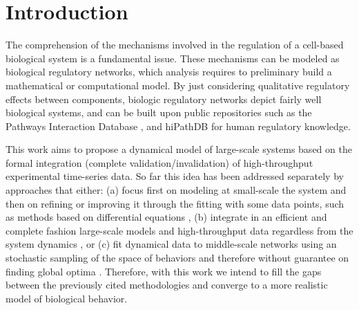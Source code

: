 
\section{Introduction}






The comprehension of the mechanisms involved in the regulation of a cell-based biological system is a fundamental 
issue. These mechanisms can be modeled as biological regulatory networks, which analysis requires to preliminary build a 
mathematical or computational model. 
By just considering qualitative regulatory effects between components, biologic regulatory networks
depict fairly well biological systems, and can be built upon public repositories such as the Pathways 
Interaction Database \cite{schaefer2009pid}, and 
hiPathDB \cite{yu2012hipathdb} for human regulatory knowledge.


This work aims to propose a dynamical model of large-scale systems based on the formal integration 
(complete validation/invalidation) of high-throughput experimental time-series data.  So far this 
idea has been addressed separately by approaches that either: (a) focus first on
modeling at small-scale the system and then on refining or improving it through the fitting with
some data points, such as methods based on differential equations \cite{tyson2003sniffers,batt2005validation,mobashir2012simulated}, 
(b) integrate in an efficient and complete fashion large-scale models
and high-throughput data regardless from the system dynamics \cite{guziolowski2013exhaustively,mitsos2009identifying}, or 
(c) fit dynamical data to middle-scale networks using an stochastic sampling of the space of behaviors and
therefore without guarantee on finding global optima \cite{macnamara2012state}. Therefore, with this
work we intend to fill the gaps between the previously cited methodologies and converge to a more
realistic model of biological behavior.


